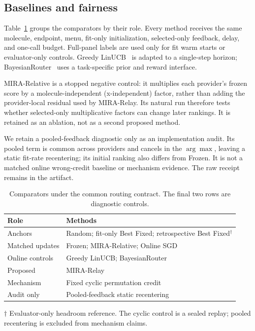 \documentclass[sigconf,anonymous]{aamas}
\newcommand{\MiraTableFont}{\fontsize{9}{11}\selectfont}
\newcommand{\tnote}[1]{{\fontsize{8.5}{10}\selectfont\raggedright\par\vspace{3pt}#1\par}}
\begin{document}
\subsection{Baselines and fairness}
Table~\ref{tab:baselines} groups the comparators by their role. Every method receives the same molecule, endpoint, menu, fit-only initialization, selected-only feedback, delay, and one-call budget. Full-panel labels are used only for fit warm starts or evaluator-only controls. Greedy LinUCB~\cite{poon2026multillm} is adapted to a single-step horizon; BayesianRouter~\cite{wu2026rewardrouting} uses a task-specific prior and reward interface.

MIRA-Relative is a stopped negative control: it multiplies each provider's frozen score by a molecule-independent (x-independent) factor, rather than adding the provider-local residual used by MIRA-Relay. Its natural run therefore tests whether selected-only multiplicative factors can change later rankings. It is retained as an ablation, not as a second proposed method.

We retain a pooled-feedback diagnostic only as an implementation audit. Its
pooled term is common across providers and cancels in the $\arg\max$, leaving
a static fit-rate recentering; its initial ranking also differs from Frozen. It
is not a matched online wrong-credit baseline or mechanism evidence. The raw
receipt remains in the artifact.

\begin{table}[t]
\caption{Comparators under the common routing contract. The final two rows are diagnostic controls.}
\label{tab:baselines}
\MiraTableFont
\setlength{\tabcolsep}{4pt}
\begin{tabular}{@{}lp{}@{}}
\toprule
Role & Methods \\
\midrule
Anchors & Random; fit-only Best Fixed; retrospective Best Fixed$^{\dagger}$ \\
Matched updates & Frozen; MIRA-Relative; Online SGD \\
Online controls & Greedy LinUCB; BayesianRouter \\
Proposed & MIRA-Relay \\
\midrule
Mechanism & Fixed cyclic permutation credit \\
Audit only & Pooled-feedback static recentering \\
\bottomrule
\end{tabular}
\tnote{$\dagger$ Evaluator-only headroom reference. The cyclic control is a sealed replay; pooled recentering is excluded from mechanism claims.}
\end{table}
\end{document}
